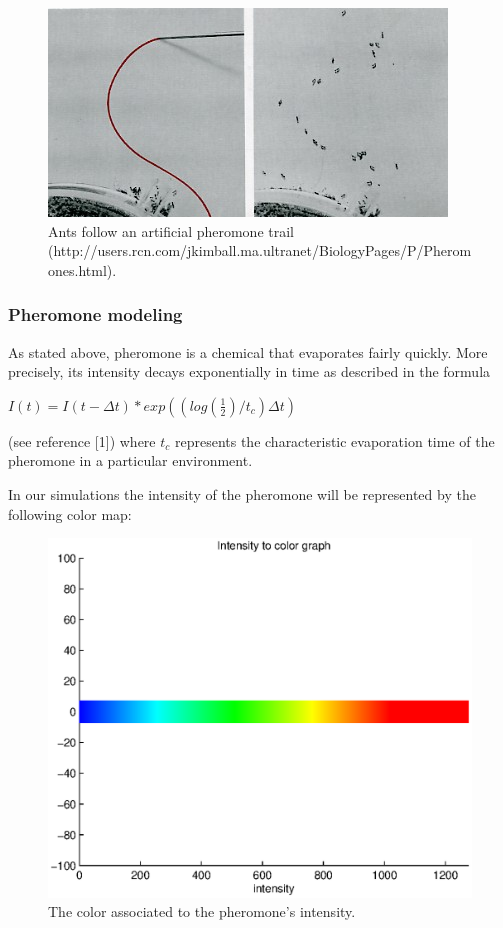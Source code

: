 \documentclass[11pt]{article}
\begin{document}
\begin{figure}[h!]
  \centering
    \includegraphics[width=.7\textwidth]{images/TrailPheromone.jpg}
     \caption{Ants follow an artificial pheromone trail (http://users.rcn.com/jkimball.ma.ultranet/BiologyPages/P/Pheromones.html).}
\end{figure}

\subsubsection{Pheromone modeling}
As stated above, pheromone is a chemical that evaporates fairly quickly. More precisely, its intensity decays exponentially in time as described in the formula
\begin{center}
$I(t)=I(t-\Delta t)*exp((log(\frac{1}{2})/t_c)\Delta t)$
\end{center}
(see reference [1])
where $t_c$ represents the characteristic evaporation time of the pheromone in a particular environment.

In our simulations the intensity of the pheromone will be represented by the following color map:

\begin{figure}[h!]
	\centering
    \includegraphics[width=.7\textwidth]{../sources/results/intensity2color.eps}
     \caption{The color associated to the pheromone's intensity.}
\end{figure}
\end{document}
